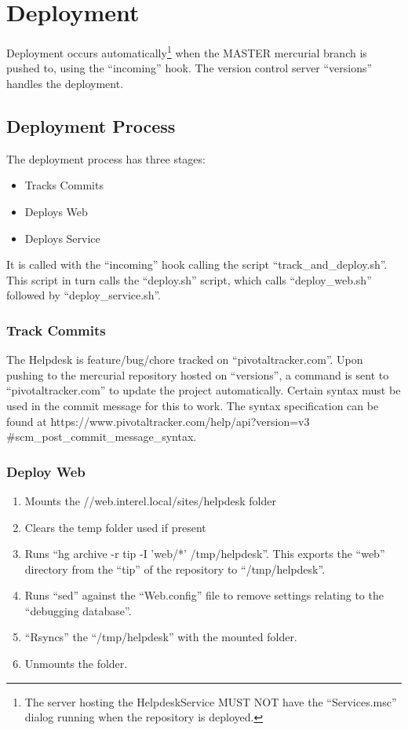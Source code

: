 \documentclass{article}
\begin{document}
\section{Deployment}
Deployment occurs automatically\footnote{The server hosting the HelpdeskService MUST NOT have the ``Services.msc'' dialog running when the repository is deployed.} when the MASTER mercurial branch is pushed to, using the ``incoming'' hook. The version control server ``versions'' handles the deployment.\\
\subsection{Deployment Process}
The deployment process has three stages:
\begin{itemize}
  \item Tracks Commits
  \item Deploys Web
  \item Deploys Service
\end{itemize}
It is called with the ``incoming'' hook calling the script ``track\_and\_deploy.sh''. This script in turn calls the ``deploy.sh'' script, which calls ``deploy\_web.sh'' followed by ``deploy\_service.sh''.
\subsubsection{Track Commits}
\label{sec:trackerintegration}
The Helpdesk is feature/bug/chore tracked on ``pivotaltracker.com''. Upon pushing to the mercurial repository hosted on ``versions'', a command is sent to ``pivotaltracker.com'' to update the project automatically. Certain syntax must be used in the commit message for this to work. The syntax specification can be found at https://www.pivotaltracker.com/help/api?version=v3\\\#scm\_post\_commit\_message\_syntax.
\subsubsection{Deploy Web}
\begin{enumerate}
  \item Mounts the //web.interel.local/sites/helpdesk folder
  \item Clears the temp folder used if present
  \item Runs ``hg  archive -r tip -I 'web/*' /tmp/helpdesk''.
    This exports the ``web'' directory from the ``tip'' of the
    repository to ``/tmp/helpdesk''.
  \item Runs ``sed'' against the ``Web.config'' file to remove
    settings relating to the ``debugging database''.
  \item ``Rsyncs'' the ``/tmp/helpdesk'' with the mounted folder.
  \item Unmounts the folder.
\end{enumerate}
\end{document}
